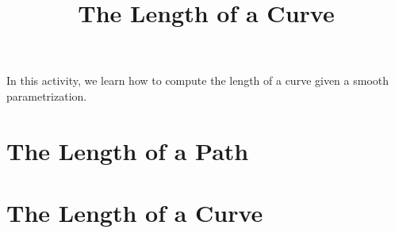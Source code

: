 \documentclass{ximera}
\title{The Length of a Curve}
\begin{document}
\begin{abstract}
\end{abstract}
\maketitle

In this activity, we learn how to compute the length of a curve given a smooth parametrization.

\section{The Length of a Path}

\section{The Length of a Curve}
\end{document}
